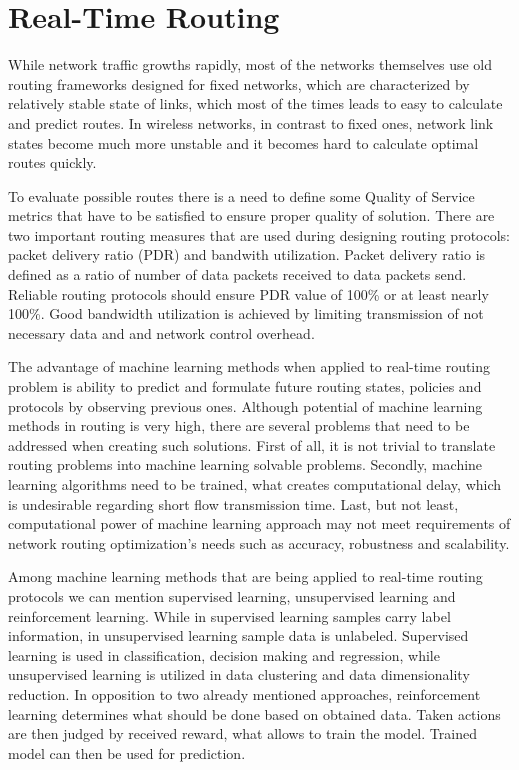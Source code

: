 \documentclass[conference]{IEEEtran}
\begin{document}
\section{Real-Time Routing}
While network traffic growths rapidly, most of the networks themselves use old routing frameworks designed for fixed networks, which are characterized by relatively stable state of links, which most of the times leads to easy to calculate and predict routes\cite{routing1}. In wireless networks, in contrast to fixed ones, network link states become much more unstable and it becomes hard to calculate optimal routes quickly.\par
To evaluate possible routes there is a need to define some Quality of Service metrics that have to be satisfied to ensure proper quality of solution. There are two important routing measures that are used during designing routing protocols: packet delivery ratio (PDR) and bandwith utilization. Packet delivery ratio is defined as a ratio of number of data packets received to data packets send. Reliable routing protocols should ensure PDR value of 100\% or at least nearly 100\%. Good bandwidth utilization is achieved by limiting transmission of not necessary data and and network control overhead\cite{routing3}. \par
The advantage of machine learning methods when applied to real-time routing problem is ability to predict and formulate future routing states, policies and protocols by observing previous ones\cite{routing4}. Although potential of machine learning methods in routing is very high, there are several problems that need to be addressed when creating such solutions. First of all, it is not trivial to translate routing problems into machine learning solvable problems. Secondly, machine learning algorithms need to be trained, what creates computational delay, which is undesirable regarding short flow transmission time. Last, but not least, computational power of machine learning approach may not meet requirements of network routing optimization's needs such as accuracy, robustness and scalability\cite{routing4}. \par
Among machine learning methods that are being applied to real-time routing protocols we can mention supervised learning, unsupervised learning and reinforcement learning\cite{routing3}. While in supervised learning samples carry label information, in unsupervised learning sample data is unlabeled. Supervised learning is used in classification, decision making and regression, while unsupervised learning is utilized in data clustering and data dimensionality reduction. In opposition to two already mentioned approaches, reinforcement learning determines what should be done based on obtained data. Taken actions are then judged by received reward, what allows to train the model. Trained model can then be used for prediction\cite{routing4}.\par
\end{document}
